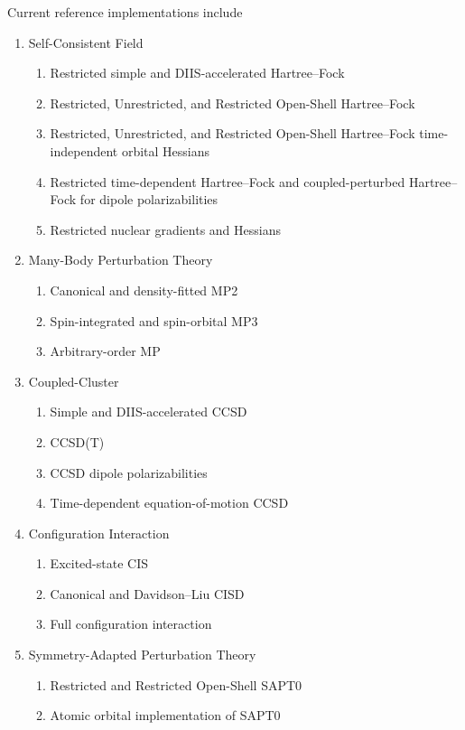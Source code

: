 \documentclass[journal=jctcce,manuscript=article]{achemso}
\begin{document}
Current reference implementations include
\begin{enumerate}
\item Self-Consistent Field
   \begin{enumerate}
   \item Restricted simple and DIIS\cite{25}-accelerated Hartree--Fock
   \item Restricted, Unrestricted, and Restricted Open-Shell Hartree--Fock
   \item Restricted, Unrestricted, and Restricted Open-Shell Hartree--Fock time-independent orbital Hessians
   \item Restricted time-dependent Hartree--Fock and coupled-perturbed Hartree--Fock for dipole polarizabilities
   \item Restricted nuclear gradients and Hessians
   \end{enumerate}

\item Many-Body Perturbation Theory
    \begin{enumerate}
    \item Canonical and density-fitted MP2
    \item Spin-integrated and spin-orbital MP3
    \item Arbitrary-order MP
    \end{enumerate}

\item Coupled-Cluster
    \begin{enumerate}
    \item Simple and DIIS-accelerated CCSD
    \item CCSD(T)
    \item CCSD dipole polarizabilities
    \item Time-dependent equation-of-motion CCSD
    \end{enumerate}

\item Configuration Interaction
    \begin{enumerate}
    \item Excited-state CIS
    \item Canonical and Davidson--Liu CISD
    \item Full configuration interaction
    \end{enumerate}

\item Symmetry-Adapted Perturbation Theory
    \begin{enumerate}
    \item Restricted and Restricted Open-Shell SAPT0
    \item Atomic orbital implementation of SAPT0
    \end{enumerate}


\end{enumerate}
\end{document}
